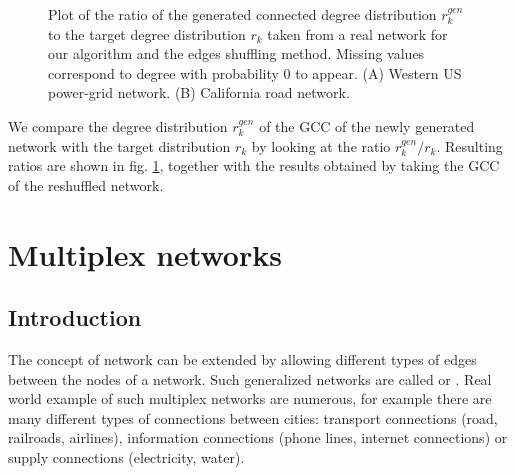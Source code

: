 \documentclass[
11pt, %
english, %
singlespacing, %
nolistspacing, %
liststotoc, %
headsepline, %
]{MastersDoctoralThesis} %
\begin{document}
\begin{figure}
	\hfill
	\caption{Plot of the ratio of the generated connected degree distribution $r^{gen}_k$ to the target degree distribution $r_k$ taken from a real network for our algorithm and the edges shuffling method. Missing values correspond to degree with probability $0$ to appear. (A) Western US power-grid network. (B) California road network.}
	\label{Figure: Real examples}
\end{figure}

We compare the degree distribution $r^{gen}_k$ of the GCC of the newly generated network with the target distribution $r_k$ by looking at the ratio $r^{gen}_k / r_k$. Resulting ratios are shown in fig. \ref{Figure: Real examples}, together with the results obtained by taking the GCC of the reshuffled network.


\chapter{Multiplex networks}
\label{Section: Multiplex networks}

\section{Introduction}

The concept of network can be extended by allowing different types of edges between the nodes of a network. Such generalized networks are called  or . Real world example of such multiplex networks are numerous, for example there are many different types of connections between cities: transport connections (road, railroads, airlines), information connections (phone lines, internet connections) or supply connections (electricity, water).
\end{document}
